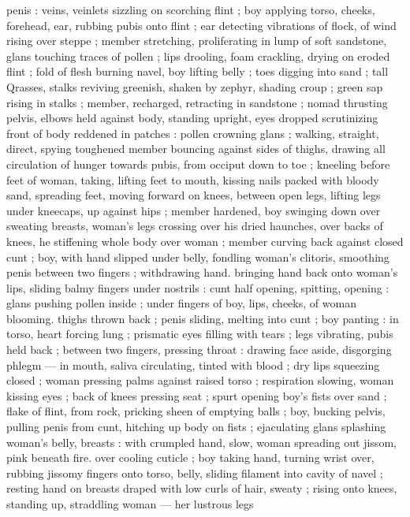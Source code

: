 penis : veins, veinlets sizzling on scorching flint ; boy applying torso,
cheeks, forehead, ear, rubbing pubis onto flint ; ear detecting
vibrations of flock, of wind rising over steppe ; member stretching,
proliferating in lump of soft sandstone, glans touching traces of
pollen ; lips drooling, foam crackling, drying on eroded flint ; fold of
flesh burning navel, boy lifting belly ; toes digging into sand ; tall
Qrasses, stalks reviving greenish, shaken by zephyr, shading croup ;
green sap rising in stalks ; member, recharged, retracting in
sandstone ; nomad thrusting pelvis, elbows held against body,
standing upright, eyes dropped scrutinizing front of body reddened
in patches : pollen crowning glans ; walking, straight, direct, spying
toughened member bouncing against sides of thighs, drawing all
circulation of hunger towards pubis, from occiput down to toe ;
kneeling before feet of woman, taking, lifting feet to mouth, kissing
nails packed with bloody sand, spreading feet, moving forward on
knees, between open legs, lifting legs under kneecaps, up against
hips ; member hardened, boy swinging down over sweating breasts,
woman's legs crossing over his dried haunches, over backs of knees,
he stiffening whole body over woman ; member curving back against
closed cunt ; boy, with hand slipped under belly, fondling woman's
clitoris, smoothing penis between two fingers ; withdrawing hand.
bringing hand back onto woman's lips, sliding balmy fingers under
nostrils : cunt half opening, spitting, opening : glans pushing pollen
inside ; under fingers of boy, lips, cheeks, of woman blooming.
thighs thrown back ; penis sliding, melting into cunt ; boy panting :
in torso, heart forcing lung ; prismatic eyes filling with tears ; legs
vibrating, pubis held back ; between two fingers, pressing throat :
drawing face aside, disgorging phlegm --- in mouth, saliva
circulating, tinted with blood ; dry lips squeezing closed ; woman
pressing palms against raised torso ; respiration slowing, woman
kissing eyes ; back of knees pressing seat ; spurt opening boy's fists
over sand ; flake of flint, from rock, pricking sheen of emptying balls
; boy, bucking pelvis, pulling penis from cunt, hitching up body on
fists ; ejaculating glans splashing woman's belly, breasts : with
crumpled hand, slow, woman spreading out jissom, pink beneath fire.
over cooling cuticle ; boy taking hand, turning wrist over, rubbing
jissomy fingers onto torso, belly, sliding filament into cavity of navel
; resting hand on breasts draped with low curls of hair, sweaty ; rising
onto knees, standing up, straddling woman --- her lustrous legs
